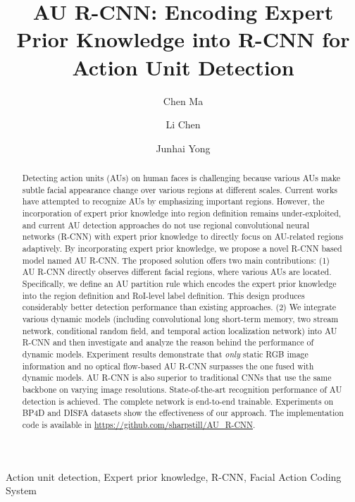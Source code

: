 \documentclass[5p,twocolumn]{elsarticle}
\begin{document}
\begin{frontmatter}
\title{AU R-CNN: Encoding Expert Prior Knowledge into R-CNN for Action Unit Detection}


\author[mymainaddress]{Chen Ma}

\author[mymainaddress]{Li Chen}
\author[mymainaddress]{Junhai Yong}


\address[mymainaddress]{School of Software, Tsinghua University, Beijing 100084, China\\Beijing National Research Center for Information Science and Technology (BNRist)}

\begin{abstract}
	Detecting action units (AUs) on human faces is challenging because various AUs make subtle facial appearance change over various regions at different scales. Current works have attempted to recognize AUs by emphasizing important regions. However, the incorporation of expert prior knowledge into region definition remains under-exploited, and current AU detection approaches do not use regional convolutional neural networks (R-CNN) with expert prior knowledge to directly focus on AU-related regions adaptively.
	By incorporating expert prior knowledge, we propose a novel R-CNN based model named AU R-CNN. The proposed solution offers two main contributions: (1) 
    AU R-CNN directly observes different facial regions, where various AUs are located. Specifically, we define an AU partition rule which encodes the expert prior knowledge into the region definition and RoI-level label definition. This design produces considerably better detection performance than existing approaches. (2) We integrate various dynamic models (including convolutional long short-term memory, two stream network, conditional random field, and temporal action localization network) into AU R-CNN and then investigate and analyze the reason behind the performance of dynamic models. Experiment results demonstrate that \textit{only} static RGB image information and no optical flow-based AU R-CNN surpasses the one fused with dynamic models. AU R-CNN is also superior to traditional CNNs that use the same backbone on varying image resolutions. State-of-the-art recognition performance of AU detection is achieved. 
    The complete network is end-to-end trainable. Experiments on BP4D and DISFA datasets show the effectiveness of our approach. The implementation code is available in \url{https://github.com/sharpstill/AU_R-CNN}.
\end{abstract}
\begin{keyword}
	Action unit detection, Expert prior knowledge, R-CNN, Facial Action Coding System
\end{keyword}

\end{frontmatter}
\end{document}
